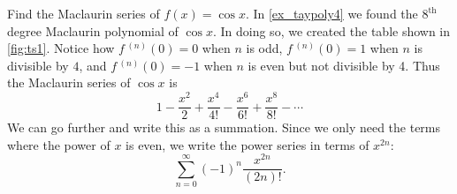 \begin{example}[The Maclaurin series of $f(x) = \cos x$]\label{ex_ts1}%
Find the Maclaurin series of $f(x)=\cos x$.
\solution
In \autoref{ex_taypoly4} we found the $8^{\text{th}}$ degree Maclaurin polynomial of $\cos x$. In doing so, we created the table shown in \autoref{fig:ts1}.
%
%
Notice how $f\,^{(n)}(0)=0$ when $n$ is odd,  $f\,^{(n)}(0)=1$ when $n$ is divisible by $4$, and $f\,^{(n)}(0)=-1$ when $n$ is even but not divisible by 4. Thus the Maclaurin series of $\cos x$ is
\[1-\frac{x^2}2+\frac{x^4}{4!}-\frac{x^6}{6!}+\frac{x^8}{8!} - \dotsb\]
We can go further and write this as a summation. Since we only need the terms where the power of $x$ is even, we write the power series in terms of $x^{2n}$:
\[\sum_{n=0}^\infty (-1)^{n}\frac{x^{2n}}{(2n)!}.\]
\end{example}

